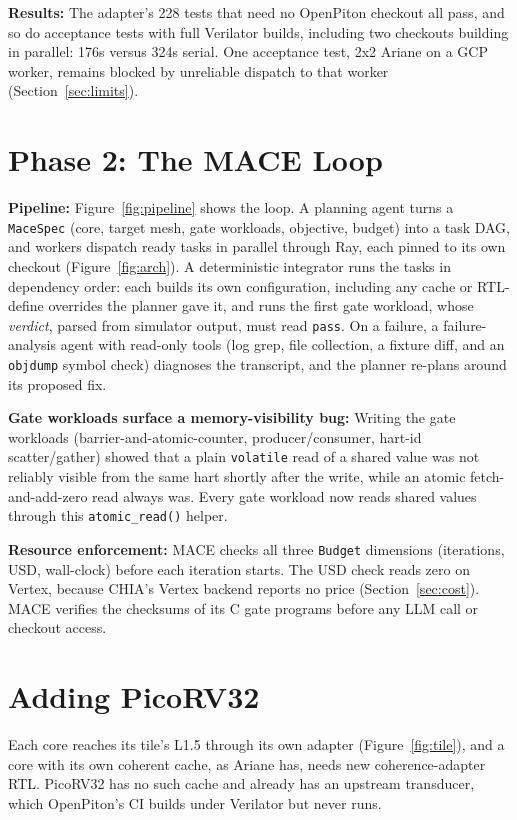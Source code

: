 \documentclass[10pt,conference,compsoc]{IEEEtran}
\newcommand{\code}[1]{\texttt{\small #1}}
\newcommand{\sys}{MACE}
\begin{document}
\textbf{Results:} The adapter's 228 tests that need no OpenPiton checkout all pass, and so do
acceptance tests with full Verilator builds, including two checkouts building in parallel: 176s
versus 324s serial. One acceptance test, 2x2 Ariane on a GCP worker, remains blocked by unreliable
dispatch to that worker (Section~\ref{sec:limits}).

\section{Phase 2: The \sys{} Loop}
\label{sec:phase2}

\textbf{Pipeline:} Figure~\ref{fig:pipeline} shows the loop. A planning agent turns a
\code{MaceSpec} (core, target mesh, gate workloads, objective, budget) into a task DAG, and workers
dispatch ready tasks in parallel through Ray, each pinned to its own checkout
(Figure~\ref{fig:arch}). A deterministic
integrator runs the tasks in dependency order: each builds its own configuration, including any
cache or RTL-define overrides the planner gave it, and runs the first gate workload, whose
\emph{verdict}, parsed from simulator output, must read \code{pass}. On
a failure, a failure-analysis agent with read-only tools (log grep, file collection, a fixture
diff, and an \code{objdump} symbol check) diagnoses the transcript, and the planner re-plans around
its proposed fix.

\textbf{Gate workloads surface a memory-visibility bug:} Writing the gate workloads
(barrier-and-atomic-counter, producer/consumer, hart-id scatter/gather) showed that a plain
\code{volatile} read of a shared value was not reliably visible from the same hart shortly after the
write, while an atomic fetch-and-add-zero read always was. Every gate workload now reads shared values through this
\code{atomic\_read()} helper.

\textbf{Resource enforcement:} \sys{} checks all three \code{Budget} dimensions (iterations, USD,
wall-clock) before each iteration starts. The USD check reads zero on Vertex, because CHIA's Vertex
backend reports no price (Section~\ref{sec:cost}). \sys{} verifies the checksums of its C gate
programs before any LLM call or checkout access.

\section{Adding PicoRV32}
\label{sec:pico}

Each core reaches its tile's L1.5 through its own adapter (Figure~\ref{fig:tile}), and a core with its
own coherent cache, as Ariane has, needs new coherence-adapter RTL. PicoRV32 has no such cache and
already has an upstream transducer, which OpenPiton's CI builds under Verilator but never runs.
\end{document}
